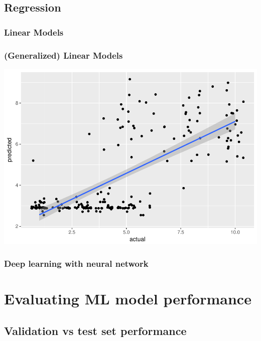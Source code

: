 \documentclass[handout, c, 11pt, xcolor=svgnames, hyperref={colorlinks,citecolor=DeepPink4,linkcolor=DarkRed,urlcolor=DarkBlue}]{beamer} %
\begin{document}
\subsection{Regression}

\subsubsection{Linear Models}

\begin{frame}
	\frametitle{(Generalized) Linear Models}
	
	\begin{center}\includegraphics[width=1\textwidth]{webinar_code_files/figure-latex/unnamed-chunk-21-1.pdf} \end{center}
\end{frame}

\subsubsection{Deep learning with neural network}




\section{Evaluating ML model performance}

\subsection{Validation vs test set performance}
\end{document}
